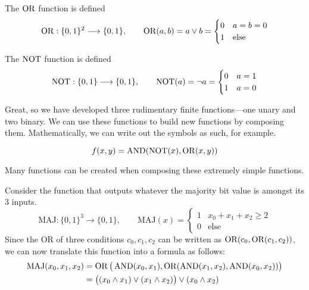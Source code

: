   \begin{definition}[OR Function]
    The $\OR$ function is defined 
    \begin{equation}
      \OR: \{0,1\}^2 \longrightarrow \{0,1\}, \qquad 
      \OR (a,b) = a \vee b = \begin{cases}
        0 & a = b = 0 \\
        1 & \text{else}
      \end{cases}
    \end{equation}
  \end{definition}

  \begin{definition}
    The $\NOT$ function is defined 
    \begin{equation}
      \NOT: \{0,1\} \longrightarrow \{0,1\}, \qquad 
      \NOT (a) = \lnot a = \begin{cases}
        0 & a = 1 \\
        1 & a = 0
      \end{cases}
    \end{equation}
  \end{definition}

  Great, so we have developed three rudimentary finite functions---one unary and two binary. We can use these functions to build new functions by composing them. Mathematically, we can write out the symbols as such, for example. 

  \begin{equation}
    f(x, y) = \AND(\NOT(x), \OR(x, y)) 
  \end{equation}

  Many functions can be created when composing these extremely simple functions. 

  \begin{example}
    Consider the function that outputs whatever the majority bit value is amongst its 3 inputs. 
    \begin{equation}
      \mathrm{MAJ}: \{0,1\}^3 \longrightarrow \{0,1\}, \qquad 
      \mathrm{MAJ} (x) = \begin{cases}
        1 & x_0 + x_1 + x_2 \geq 2 \\
        0 & \text{else}
      \end{cases}
    \end{equation}
    Since the OR of three conditions $c_0, c_1, c_2$ can be written as $\OR(c_0, \OR(c_1, c_2))$, we can now translate this function into a formula as follows: 
    \begin{align}
      \mathrm{MAJ}(x_0, x_1, x_2) & = \OR\big( \AND (x_0, x_1), \OR(\AND(x_1, x_2), \AND(x_0, x_2)) \big) \\
      & = \big((x_0 \wedge x_1) \vee (x_1 \wedge x_2)\big) \vee (x_0 \wedge x_2)
    \end{align}
  \end{example}

